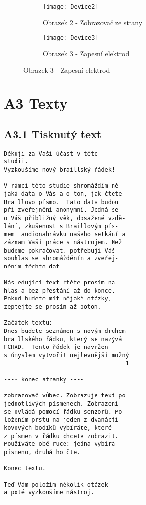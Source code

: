 \begin{figure}
\centering
\begin{subfigure}{.5\textwidth}
  \centering
  \texttt{[image: Device2]}
  \caption{Obrazek 2 - Zobrazovač ze strany}
  \label{fig:sub1}
\end{subfigure}%
\begin{subfigure}{.5\textwidth}
  \centering
  \texttt{[image: Device3]}
  \caption{Obrazek 3 - Zapesní elektrod}
  \label{fig:sub2}
\end{subfigure}
\label{fig:test}
\end{figure}


\clearpage

\section*{A3 Texty}
\subsection*{A3.1 Tisknutý text}
\begin{verbatim}
Děkuji za Vaši účast v této
studii.
Vyzkoušíme nový braillský řádek!

V rámci této studie shromáždím ně-
jaká data o Vás a o tom, jak čtete
Braillovo písmo.  Tato data budou
při zveřejnění anonymní. Jedná se
o Váš přibližný věk, dosažené vzdě-
lání, zkušenost s Braillovým pís-
mem, audionahrávku našeho setkání a
záznam Vaší práce s nástrojem. Než
budeme pokračovat, potřebuji Váš
souhlas se shromážděním a zveřej-
něním těchto dat.

Následující text čtěte prosím na-
hlas a bez přestání až do konce.
Pokud budete mít nějaké otázky,
zeptejte se prosím až potom.

Začátek textu:
Dnes budete seznámen s novým druhem
braillského řádku, který se nazývá
FCHAD.  Tento řádek je navržen
s úmyslem vytvořit nejlevnější možný
                                   1

---- konec stranky ----

zobrazovač vůbec. Zobrazuje text po
jednotlivých písmenech. Zobrazení
se ovládá pomocí řádku senzorů. Po-
ložením prstu na jeden z dvanácti
kovových bodíků vybíráte, které
z písmen v řádku chcete zobrazit.
Používáte obě ruce: jedna vybírá
písmeno, druhá ho čte.

Konec textu.

Teď Vám položím několik otázek
a poté vyzkoušíme nástroj.
 ---------------------
\end{verbatim}
\clearpage
